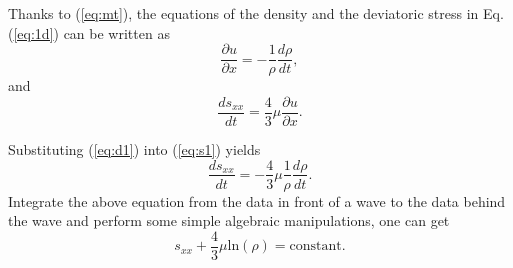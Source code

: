 \documentclass{article}
\numberwithin{equation}{section}
\numberwithin{table}{section}
\begin{document}
Thanks to (\ref{eq:mt}), the equations of the density and the deviatoric stress in Eq.(\ref{eq:1d}) can be written as
  \begin{equation}\label{eq:d1}
    \frac{\partial u}{\partial x} = -\frac{1}{\rho}\frac{d\rho}{dt},
  \end{equation}
  and
  \begin{equation}\label{eq:s1}
    \frac{ds_{xx}}{dt}=\frac{4}{3}\mu\frac{\partial u}{\partial x}.
  \end{equation}

  Substituting (\ref{eq:d1}) into (\ref{eq:s1}) yields
  \begin{equation}
    \frac{ds_{xx}}{dt}=-\frac{4}{3}\mu \frac{1}{\rho}\frac{d\rho}{dt}.
\end{equation}
Integrate the above equation from the data in front of a wave to the data behind the wave and perform some simple algebraic manipulations, one can get
\begin{equation}\label{eq:rhosxx}
  s_{xx}+\frac{4}{3}\mu\text{ln}(\rho) = \text{constant}.
\end{equation}
\end{document}
